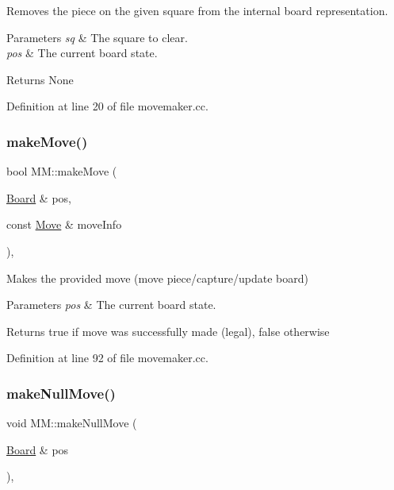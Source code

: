 Removes the piece on the given square from the internal board representation. 


\begin{DoxyParams}{Parameters}
{\em sq} & The square to clear. \\
\hline
{\em pos} & The current board state. \\
\hline
\end{DoxyParams}
\begin{DoxyReturn}{Returns}
None 
\end{DoxyReturn}


Definition at line 20 of file movemaker.\+cc.

\mbox{\label{classMM_ad56f88355a078f3b14b290fe153966b4}} 
\subsubsection{\texorpdfstring{make\+Move()}{makeMove()}}
{\footnotesize\ttfamily bool M\+M\+::make\+Move (\begin{DoxyParamCaption}\item[{\mbox{\hyperlink{classBoard}{Board}} \&}]{pos,  }\item[{const \mbox{\hyperlink{classMove}{Move}} \&}]{move\+Info }\end{DoxyParamCaption})\hspace{0.3cm}{\ttfamily [static]}, {\ttfamily [noexcept]}}



Makes the provided move (move piece/capture/update board) 


\begin{DoxyParams}{Parameters}
{\em pos} & The current board state. \\
\hline
\end{DoxyParams}
\begin{DoxyReturn}{Returns}
true if move was successfully made (legal), false otherwise 
\end{DoxyReturn}


Definition at line 92 of file movemaker.\+cc.

\mbox{\label{classMM_a363e843e6bebaf747bf9482c963ed6b9}} 
\subsubsection{\texorpdfstring{make\+Null\+Move()}{makeNullMove()}}
{\footnotesize\ttfamily void M\+M\+::make\+Null\+Move (\begin{DoxyParamCaption}\item[{\mbox{\hyperlink{classBoard}{Board}} \&}]{pos }\end{DoxyParamCaption})\hspace{0.3cm}{\ttfamily [static]}, {\ttfamily [noexcept]}}



